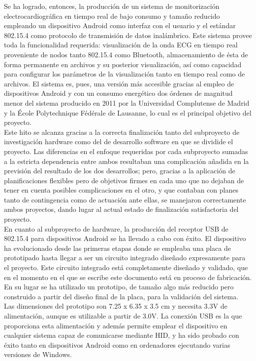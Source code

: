 	Se ha logrado, entonces, la producción de un sistema de monitorización electrocardiográfica en tiempo real de bajo consumo y tamaño reducido empleando un dispositivo Android como interfaz con el usuario y el estándar 802.15.4 como protocolo de transmisión de datos inalámbrico. Este sistema provee toda la funcionalidad requerida: visualización de la onda ECG en tiempo real proveniente de nodos tanto 802.15.4 como Bluetooth, almacenamiento de ésta de forma permanente en archivos y su posterior visualización, así como capacidad para configurar los parámetros de la visualización tanto en tiempo real como de archivos. El sistema es, pues, una versión más accesible gracias al empleo de dispositivos Android y con un consumo energético dos órdenes de magnitud menor del sistema producido en 2011 por la Universidad Complutense de Madrid y la École Polytechnique Fédérale de Lausanne, lo cual es el principal objetivo del proyecto.\\

	Este hito se alcanza gracias a la correcta finalización tanto del subproyecto de investigación hardware como del de desarrollo software en que se dividide el proyecto. Las diferencias en el enfoque requeridas por cada subproyecto sumadas a la estricta dependencia entre ambos resultaban una complicación añadida en la previsión del resultado de los dos desarrollos; pero, gracias a la aplicación de planificaciones flexibles pero de objetivos firmes en cada uno que no dejaban de tener en cuenta posibles complicaciones en el otro, y que contaban con planes tanto de contingencia como de actuación ante ellas, se manejaron correctamente ambos proyectos, dando lugar al actual estado de finalización satisfactoria del proyecto.\\

	En cuanto al subproyecto de hardware, la producción del receptor USB de 802.15.4 para dispositivos Android se ha llevado a cabo con éxito. El dispositivo ha evolucionado desde las primeras etapas donde se empleaba una placa de prototipado hasta llegar a ser un circuito integrado diseñado expresamente para el proyecto. Este circuito integrado está completamente diseñado y validado, que en el momento en el que se escribe este documento está en proceso de fabricación. En su lugar se ha utilizado un prototipo, de tamaño algo más reducido pero construido a partir del diseño final de la placa, para la validación del sistema.\\

	Las dimensiones del prototipo son 7.25 x 6.35 x 3.5 cm y necesita 3.3V de alimentación, aunque es utilizable a partir de 3.0V. La conexión USB es la que proporciona esta alimentación y además permite emplear el dispositivo en cualquier sistema capaz de comunicarse mediante HID, y ha sido probado con éxito tanto en dispositivos Android como en ordenadores ejecutando varias versiones de Windows.\\

